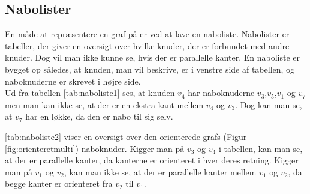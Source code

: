 \subsection{Nabolister}
En måde at repræsentere en graf på er ved at lave en naboliste. Nabolister er tabeller, der giver en oversigt over hvilke knuder, der er forbundet med andre knuder. Dog vil man ikke kunne se, hvis der er parallelle kanter. En naboliste er bygget op således, at knuden, man vil beskrive, er i venstre side af tabellen, og naboknuderne er skrevet i højre side. \\




Ud fra tabellen \ref{tab:naboliste1} ses, at knuden $v_4$ har naboknuderne $v_3$,$v_5$,$v_1$ og $v_7$ men man kan ikke se, at der er en ekstra kant mellem $v_4$ og $v_3$. Dog kan man se, at $v_7$ har en løkke, da den er nabo til sig selv.


\ref{tab:naboliste2} viser en oversigt over den orienterede grafs (Figur \ref{fig:orienteretmulti}) naboknuder. Kigger man på $v_3$ og $v_4$ i tabellen, kan man se, at der er parallelle kanter, da kanterne er orienteret i hver deres retning. Kigger man på $v_1$ og $v_2$, kan man ikke se, at der er parallelle kanter mellem $v_1$ og $v_2$, da begge kanter er orienteret fra $v_2$ til $v_1$.
